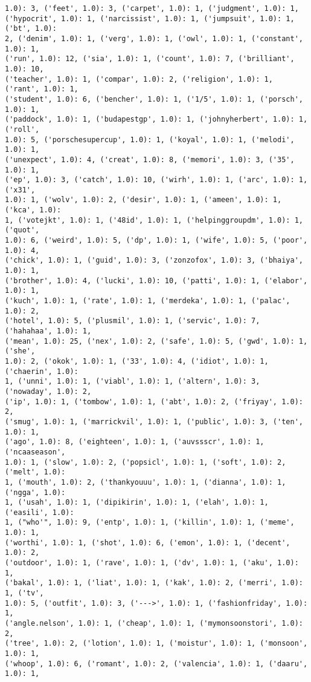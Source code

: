 \documentclass[11pt]{article}
\begin{document}
\begin{Verbatim}[commandchars=\\\{\}]
1.0): 3, ('feet', 1.0): 3, ('carpet', 1.0): 1, ('judgment', 1.0): 1,
('hypocrit', 1.0): 1, ('narcissist', 1.0): 1, ('jumpsuit', 1.0): 1, ('bt', 1.0):
2, ('denim', 1.0): 1, ('verg', 1.0): 1, ('owl', 1.0): 1, ('constant', 1.0): 1,
('run', 1.0): 12, ('sia', 1.0): 1, ('count', 1.0): 7, ('brilliant', 1.0): 10,
('teacher', 1.0): 1, ('compar', 1.0): 2, ('religion', 1.0): 1, ('rant', 1.0): 1,
('student', 1.0): 6, ('bencher', 1.0): 1, ('1/5', 1.0): 1, ('porsch', 1.0): 1,
('paddock', 1.0): 1, ('budapestgp', 1.0): 1, ('johnyherbert', 1.0): 1, ('roll',
1.0): 5, ('porschesupercup', 1.0): 1, ('koyal', 1.0): 1, ('melodi', 1.0): 1,
('unexpect', 1.0): 4, ('creat', 1.0): 8, ('memori', 1.0): 3, ('35', 1.0): 1,
('ep', 1.0): 3, ('catch', 1.0): 10, ('wirh', 1.0): 1, ('arc', 1.0): 1, ('x31',
1.0): 1, ('wolv', 1.0): 2, ('desir', 1.0): 1, ('ameen', 1.0): 1, ('kca', 1.0):
1, ('votejkt', 1.0): 1, ('48id', 1.0): 1, ('helpinggroupdm', 1.0): 1, ('quot',
1.0): 6, ('weird', 1.0): 5, ('dp', 1.0): 1, ('wife', 1.0): 5, ('poor', 1.0): 4,
('chick', 1.0): 1, ('guid', 1.0): 3, ('zonzofox', 1.0): 3, ('bhaiya', 1.0): 1,
('brother', 1.0): 4, ('lucki', 1.0): 10, ('patti', 1.0): 1, ('elabor', 1.0): 1,
('kuch', 1.0): 1, ('rate', 1.0): 1, ('merdeka', 1.0): 1, ('palac', 1.0): 2,
('hotel', 1.0): 5, ('plusmil', 1.0): 1, ('servic', 1.0): 7, ('hahahaa', 1.0): 1,
('mean', 1.0): 25, ('nex', 1.0): 2, ('safe', 1.0): 5, ('gwd', 1.0): 1, ('she',
1.0): 2, ('okok', 1.0): 1, ('33', 1.0): 4, ('idiot', 1.0): 1, ('chaerin', 1.0):
1, ('unni', 1.0): 1, ('viabl', 1.0): 1, ('altern', 1.0): 3, ('nowaday', 1.0): 2,
('ip', 1.0): 1, ('tombow', 1.0): 1, ('abt', 1.0): 2, ('friyay', 1.0): 2,
('smug', 1.0): 1, ('marrickvil', 1.0): 1, ('public', 1.0): 3, ('ten', 1.0): 1,
('ago', 1.0): 8, ('eighteen', 1.0): 1, ('auvssscr', 1.0): 1, ('ncaaseason',
1.0): 1, ('slow', 1.0): 2, ('popsicl', 1.0): 1, ('soft', 1.0): 2, ('melt', 1.0):
1, ('mouth', 1.0): 2, ('thankyouuu', 1.0): 1, ('dianna', 1.0): 1, ('ngga', 1.0):
1, ('usah', 1.0): 1, ('dipikirin', 1.0): 1, ('elah', 1.0): 1, ('easili', 1.0):
1, ("who'", 1.0): 9, ('entp', 1.0): 1, ('killin', 1.0): 1, ('meme', 1.0): 1,
('worthi', 1.0): 1, ('shot', 1.0): 6, ('emon', 1.0): 1, ('decent', 1.0): 2,
('outdoor', 1.0): 1, ('rave', 1.0): 1, ('dv', 1.0): 1, ('aku', 1.0): 1,
('bakal', 1.0): 1, ('liat', 1.0): 1, ('kak', 1.0): 2, ('merri', 1.0): 1, ('tv',
1.0): 5, ('outfit', 1.0): 3, ('--->', 1.0): 1, ('fashionfriday', 1.0): 1,
('angle.nelson', 1.0): 1, ('cheap', 1.0): 1, ('mymonsoonstori', 1.0): 2,
('tree', 1.0): 2, ('lotion', 1.0): 1, ('moistur', 1.0): 1, ('monsoon', 1.0): 1,
('whoop', 1.0): 6, ('romant', 1.0): 2, ('valencia', 1.0): 1, ('daaru', 1.0): 1,

\end{Verbatim}
\end{document}
